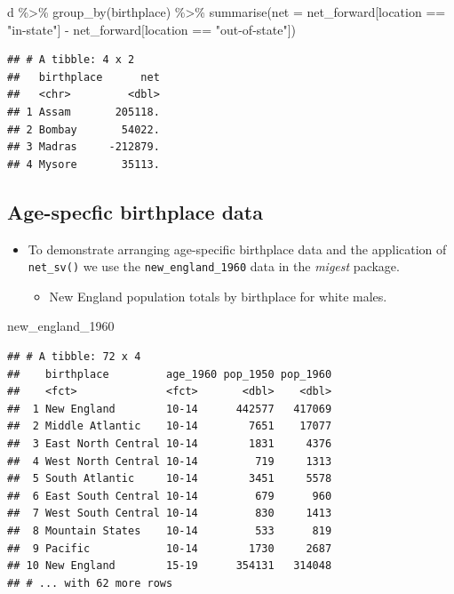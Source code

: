\documentclass[
]{book}
\newenvironment{Shaded}{\begin{snugshade}}{\end{snugshade}}
\newcommand{\AttributeTok}[1]{\textcolor[rgb]{0.77,0.63,0.00}{#1}}
\newcommand{\FunctionTok}[1]{\textcolor[rgb]{0.00,0.00,0.00}{#1}}
\newcommand{\NormalTok}[1]{#1}
\newcommand{\SpecialCharTok}[1]{\textcolor[rgb]{0.00,0.00,0.00}{#1}}
\newcommand{\StringTok}[1]{\textcolor[rgb]{0.31,0.60,0.02}{#1}}
\providecommand{\tightlist}{%
  \setlength{\itemsep}{0pt}\setlength{\parskip}{0pt}}
\begin{document}
\begin{Shaded}
\begin{Highlighting}[]
\NormalTok{d }\SpecialCharTok{\%\textgreater{}\%}
  \FunctionTok{group\_by}\NormalTok{(birthplace) }\SpecialCharTok{\%\textgreater{}\%}
  \FunctionTok{summarise}\NormalTok{(}\AttributeTok{net =}\NormalTok{ net\_forward[location }\SpecialCharTok{==} \StringTok{"in{-}state"}\NormalTok{] }\SpecialCharTok{{-}}
\NormalTok{              net\_forward[location }\SpecialCharTok{==} \StringTok{"out{-}of{-}state"}\NormalTok{])}
\end{Highlighting}
\end{Shaded}

\begin{verbatim}
## # A tibble: 4 x 2
##   birthplace      net
##   <chr>         <dbl>
## 1 Assam       205118.
## 2 Bombay       54022.
## 3 Madras     -212879.
## 4 Mysore       35113.
\end{verbatim}

\hypertarget{age-specfic-birthplace-data-2}{%
\subsection{Age-specfic birthplace data}\label{age-specfic-birthplace-data-2}}

\begin{itemize}
\tightlist
\item
  To demonstrate arranging age-specific birthplace data and the application of \texttt{net\_sv()} we use the \texttt{new\_england\_1960} data in the \emph{migest} package.

  \begin{itemize}
  \tightlist
  \item
    New England population totals by birthplace for white males.
  \end{itemize}
\end{itemize}

\begin{Shaded}
\begin{Highlighting}[]
\NormalTok{new\_england\_1960}
\end{Highlighting}
\end{Shaded}

\begin{verbatim}
## # A tibble: 72 x 4
##    birthplace         age_1960 pop_1950 pop_1960
##    <fct>              <fct>       <dbl>    <dbl>
##  1 New England        10-14      442577   417069
##  2 Middle Atlantic    10-14        7651    17077
##  3 East North Central 10-14        1831     4376
##  4 West North Central 10-14         719     1313
##  5 South Atlantic     10-14        3451     5578
##  6 East South Central 10-14         679      960
##  7 West South Central 10-14         830     1413
##  8 Mountain States    10-14         533      819
##  9 Pacific            10-14        1730     2687
## 10 New England        15-19      354131   314048
## # ... with 62 more rows
\end{verbatim}
\end{document}
